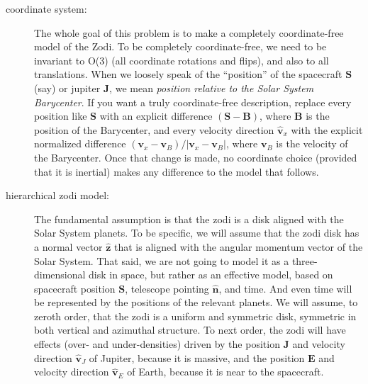 \documentclass{article}
\renewcommand{\vec}[1]{\mathbf{#1}}
\begin{document}
\begin{description}
    \item[coordinate system:]
    The whole goal of this problem is to make a completely coordinate-free model of the Zodi.
    To be completely coordinate-free, we need to be invariant to O(3) (all coordinate rotations and flips), and also to all translations.
    When we loosely speak of the ``position'' of the spacecraft $\vec{S}$ (say) or jupiter $\vec{J}$, we mean \emph{position relative to the Solar System Barycenter}.
    If you want a truly coordinate-free description, replace every position like $\vec{S}$ with an explicit difference $(\vec{S}-\vec{B})$, where $\vec{B}$ is the position of the Barycenter, and every velocity direction $\vec{\hat{v}}_x$ with the explicit normalized difference $(\vec{v}_x-\vec{v}_B)/|\vec{v}_x-\vec{v}_B|$, where $\vec{v}_B$ is the velocity of the Barycenter.
    Once that change is made, no coordinate choice (provided that it is inertial) makes any difference to the model that follows.

    \item[hierarchical zodi model:]
    The fundamental assumption is that the zodi is a disk aligned with the Solar System planets.
    To be specific, we will assume that the zodi disk has a normal vector $\vec{\hat{z}}$ that is aligned with the angular momentum vector of the Solar System.
    That said, we are not going to model it as a three-dimensional disk in space, but rather as an effective model, based on spacecraft position $\vec{S}$, telescope pointing $\vec{\hat{n}}$, and time.
    And even time will be represented by the positions of the relevant planets.
    We will assume, to zeroth order, that the zodi is a uniform and symmetric disk, symmetric in both vertical and azimuthal structure.
    To next order, the zodi will have effects (over- and under-densities) driven by the position $\vec{J}$ and velocity direction $\vec{\hat{v}}_J$ of Jupiter, because it is massive, and the position $\vec{E}$ and velocity direction $\vec{\hat{v}}_E$ of Earth, because it is near to the spacecraft.
    

\end{description}
\end{document}
